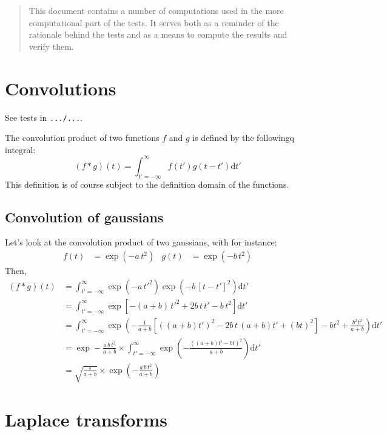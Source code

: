 \documentclass{article}
\newcommand{\dd}{\mathrm{d}}
\newcommand{\pa}[1]{\left(#1\right)}
\newcommand{\pab}[1]{\left[#1\right]}
\begin{document}
\begin{abstract}
  This document contains a number of computations used in the more
  computational part of the tests. It serves both as a reminder of the
  rationale behind the tests and as a means to compute the results and
  verify them.
\end{abstract}

\section{Convolutions}

See tests in \texttt{.../...}.

The convolution product of two functions $f$ and $g$ is defined by the followingq
integral:
%
\begin{equation}
  (f\mathop{*}g)(t) = \int_{t' = -\infty}^{\infty} f(t') g(t-t') \dd t'
  \label{eq:convolution}
\end{equation}
%
This definition is of course subject to the definition domain of the
functions.

\subsection{Convolution of gaussians}

Let's look at the convolution product of two gaussians, with for
instance:
%
\begin{align}
  f(t) &= \exp \pa{-a\,t^2} &
  g(t) &= \exp \pa{-b\,t^2}
\end{align}
%
Then,
\begin{align}
  (f\mathop{*}g)(t) &=
  \int_{t' = -\infty}^{\infty}
  \exp \pa{-a\,t'^2}\exp \pa{-b\,[t-t']^2} \dd t'\\[3mm]
  &= 
  \int_{t' = -\infty}^{\infty}
  \exp \pab{-\pa{a+b}\,t'^2 + 2b\,t\,t' - b\,t^2} \dd t'\\[3mm]
  &= 
  \int_{t' = -\infty}^{\infty}
  \exp
  \pa{-\frac{1}{a+b}
    \pab{\pa{(a+b)t'}^2 - 2b\,t\,\pa{a+b}t' + \pa{b t}^2}
    - bt^2 + \frac{b^2t^2}{a+b}
  } \dd t'\\[3mm]
  &=
  \exp -\frac{a\,b\,t^2}{a+b} \times
  \int_{t' = -\infty}^{\infty}
  \exp
  \pa{-\frac{\pa{(a+b)t' - bt}^2}{a+b}}
  \dd t'\\[3mm]
  &= \sqrt{\frac{\pi}{a+b}} \times 
  \exp \pa{-\frac{a\,b\,t^2}{a+b}}
\end{align}


\section{Laplace transforms}
\end{document}

